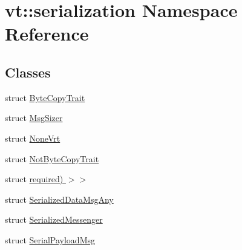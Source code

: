 \hypertarget{namespacevt_1_1serialization}{}\section{vt\+:\+:serialization Namespace Reference}
\label{namespacevt_1_1serialization}
\subsection*{Classes}
\begin{DoxyCompactItemize}
\item 
struct \hyperlink{structvt_1_1serialization_1_1_byte_copy_trait}{Byte\+Copy\+Trait}
\item 
struct \hyperlink{structvt_1_1serialization_1_1_msg_sizer}{Msg\+Sizer}
\item 
struct \hyperlink{structvt_1_1serialization_1_1_none_vrt}{None\+Vrt}
\item 
struct \hyperlink{structvt_1_1serialization_1_1_not_byte_copy_trait}{Not\+Byte\+Copy\+Trait}
\item 
struct \hyperlink{structvt_1_1serialization_1_1_msg_sizer_3_01_msg_t_00_01typename_01std_1_1enable__if__t_3_01true765b7ed5f37ccd7e70aee4400f6390bc}{required) $>$$>$}
\item 
struct \hyperlink{structvt_1_1serialization_1_1_serialized_data_msg_any}{Serialized\+Data\+Msg\+Any}
\item 
struct \hyperlink{structvt_1_1serialization_1_1_serialized_messenger}{Serialized\+Messenger}
\item 
struct \hyperlink{structvt_1_1serialization_1_1_serial_payload_msg}{Serial\+Payload\+Msg}
\end{DoxyCompactItemize}
